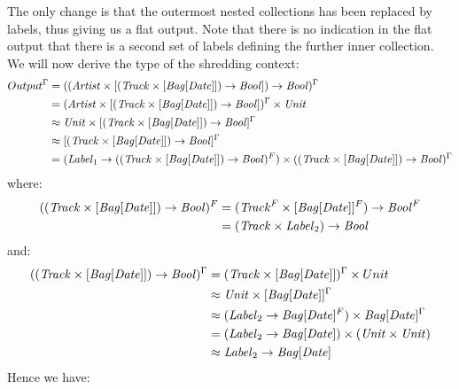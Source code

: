 {{{The only change is that the outermost nested collections has been replaced by labels, thus giving us a flat output. Note that there is no indication in the flat output that there is a second set of labels defining the further inner collection. We will now derive the type of the shredding context:
\begin{equation*}
\begin{split}
Output^\G &=(\coll{(\prim{Artist} \times [\coll{(\prim{Track} \times [\Bag{\prim{Date}]})}{\prim{Bool}}])}{\prim{Bool}})^\G \\
&=(\prim{Artist} \times [\coll{(\prim{Track} \times [\Bag{\prim{Date}]})}{\prim{Bool}}])^\G \times \prim{Unit} \\
&\approx\prim{Unit} \times [\coll{(\prim{Track} \times [\Bag{\prim{Date}]})}{\prim{Bool}}]^\G \\
&\approx [\coll{(\prim{Track} \times [\Bag{\prim{Date}]})}{\prim{Bool}}]^\G \\
&=(\coll{\Label_1}{\coll{((\prim{Track} \times [\Bag{\prim{Date}}])}{\prim{Bool}})^F}) \times ((\coll{\prim{Track} \times [\Bag{\prim{Date}}])}{\prim{Bool}})^\G \\
\end{split}
\end{equation*}
where:
\begin{equation*}
\begin{split}
\coll{((\prim{Track} \times [\Bag{\prim{Date}}])}{\prim{Bool}})^F &=\coll{(\prim{Track}^F \times [\Bag{\prim{Date}}]^F)}{\prim{Bool}}^F \\
&=\coll{(\prim{Track} \times \Label_2)}{\prim{Bool}} \\
\end{split}
\end{equation*}
and:
\begin{equation*}
\begin{split}
((\coll{\prim{Track} \times [\Bag{\prim{Date}}])}{\prim{Bool}})^\G &= (\prim{Track} \times [\Bag{\prim{Date}}])^\G \times Unit\\
&\approx \prim{Unit} \times [\Bag{\prim{Date}}]^\G \\
&\approx (\coll{\Label_2}{\Bag{\prim{Date}}^F}) \times \Bag{\prim{Date}}^\G \\
&= (\coll{\Label_2}{\Bag{\prim{Date}}}) \times (\prim{Unit} \times \prim{Unit}) \\
&\approx \coll{\Label_2}{\Bag{\prim{Date}}}
\end{split}
\end{equation*}
Hence we have:
\begin{equation*}

\end{equation*}}}}
